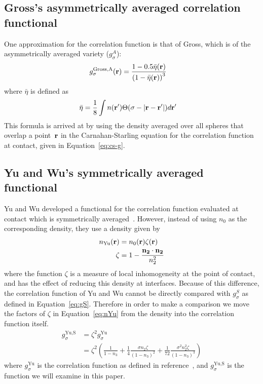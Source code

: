 \subsection{Gross's asymmetrically averaged correlation functional}\label{sec:gross}
One approximation for the correlation function is that of
Gross\cite{gross2009density}, which is of the asymmetrically averaged
variety ($g_\sigma^A$):
\begin{align}
  g_\sigma^\text{Gross,A}(\textbf{r}) &= \frac{1 - 0.5\bar{\eta}(\mathbf{r})}{\left(1 -
    \bar{\eta}(\mathbf{r})\right)^3}
\end{align}
where $\bar{\eta}$ is defined as
\begin{align}
\bar{\eta} &= \frac{1}{8} \int n(\textbf{r}') \Theta(\sigma -\left|\textbf{r} - \textbf{r}'\right|)
  d\textbf{r}'
\end{align}
This formula is arrived at by using the density averaged over all
spheres that overlap a point~$\textbf{r}$ in the
Carnahan-Starling equation for the correlation function at contact,
given in Equation~\ref{eq:cs-g}.

\subsection{Yu and Wu's symmetrically averaged functional}\label{sec:yuwu}

Yu and Wu developed a functional for the correlation function
evaluated at contact which is symmetrically
averaged~\cite{yu2002fmt-dft-inhomogeneous-associating}.  However,
instead of using $n_0$ as the corresponding density, they use a
density given by
\begin{align}
  n_\text{Yu}(\textbf{r}) &= n_0(\textbf{r}) \zeta(\textbf{r}) \label{eq:nYu} \\
  \zeta &= 1 - \frac{\mathbf{n_2}\cdot\mathbf{n_2}}{n_2^2} \label{eq:zeta}
\end{align}
where the function $\zeta$ is a measure of local inhomogeneity at the
point of contact, and has the effect of reducing this density at
interfaces.  Because of this difference, the correlation function of
Yu and Wu cannot be directly compared with $g_\sigma^S$ as defined in
Equation~\ref{eq:gS}.  Therefore in order to make a comparison we move
the factors of $\zeta$ in Equation~\ref{eq:nYu} from the density into
the correlation function itself.
\begin{align}
  g_\sigma^\text{Yu,S} &= \zeta^2 g_\sigma^\text{Yu} \\
   &= \zeta^2\left(\frac{1}{1-n_3}
    + \frac14 \frac{\sigma n_2\zeta}{(1-n_3)^2}
    + \frac1{72} \frac{\sigma^2 n_2^2 \zeta}{(1-n_3)^3}\right)
\end{align}
where $g_\sigma^\text{Yu}$ is the correlation function as defined in
reference~\cite{yu2002fmt-dft-inhomogeneous-associating}, and
$g_\sigma^\text{Yu,S}$ is the function we will examine in this paper.


